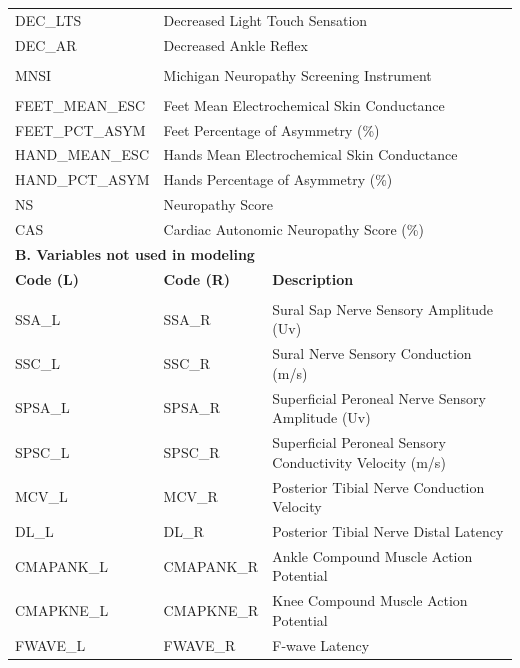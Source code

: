 \documentclass[pdflatex,sn-mathphys-num]{sn-jnl}%
\theoremstyle{thmstyleone}%
\theoremstyle{thmstyletwo}%
\theoremstyle{thmstylethree}%
\begin{document}
\begin{appendices}
\begin{table}[!tbp]
\begin{tabular}{lll}
        DEC\_LTS & \multicolumn{2}{l}{Decreased Light Touch Sensation} \\
        DEC\_AR & \multicolumn{2}{l}{Decreased Ankle Reflex} \\
        \addlinespace
        \multicolumn{3}{l}{\textit{MNSI}} \\
        MNSI & \multicolumn{2}{l}{Michigan Neuropathy Screening Instrument} \\
        \addlinespace
        \multicolumn{3}{l}{\textit{Sudoscan}} \\
        FEET\_MEAN\_ESC & \multicolumn{2}{l}{Feet Mean Electrochemical Skin Conductance} \\
        FEET\_PCT\_ASYM & \multicolumn{2}{l}{Feet Percentage of Asymmetry (\%)} \\
        HAND\_MEAN\_ESC & \multicolumn{2}{l}{Hands Mean Electrochemical Skin Conductance} \\
        HAND\_PCT\_ASYM & \multicolumn{2}{l}{Hands Percentage of Asymmetry (\%)} \\
        NS & \multicolumn{2}{l}{Neuropathy Score} \\
        CAS & \multicolumn{2}{l}{Cardiac Autonomic Neuropathy Score (\%)} \\
        \midrule
        \multicolumn{3}{l}{\textbf{B. Variables not used in modeling}} \\
        \midrule
        \textbf{Code (L)} & \textbf{Code (R)} & \textbf{Description} \\
        \midrule
        \addlinespace
        \multicolumn{3}{l}{\textit{Nerve Conduction Study}} \\
        SSA\_L & SSA\_R & Sural Sap Nerve Sensory Amplitude (Uv) \\
        SSC\_L & SSC\_R & Sural Nerve Sensory Conduction (m/s) \\
        SPSA\_L & SPSA\_R & Superficial Peroneal Nerve Sensory Amplitude (Uv) \\
        SPSC\_L & SPSC\_R & Superficial Peroneal Sensory Conductivity Velocity (m/s) \\
        MCV\_L & MCV\_R & Posterior Tibial Nerve Conduction Velocity \\
        DL\_L & DL\_R & Posterior Tibial Nerve Distal Latency \\
        CMAPANK\_L & CMAPANK\_R & Ankle Compound Muscle Action Potential \\
        CMAPKNE\_L & CMAPKNE\_R & Knee Compound Muscle Action Potential \\
        FWAVE\_L & FWAVE\_R & F-wave Latency \\

\end{tabular}
\end{table}
\end{appendices}
\end{document}
